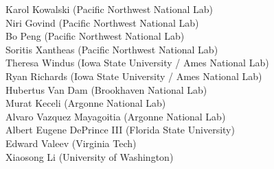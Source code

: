 \documentclass[10pt]{res} %
\begin{document}
\begin{resume}
Karol Kowalski \dotfill (Pacific Northwest National Lab)\\
Niri Govind \dotfill (Pacific Northwest National Lab)\\
Bo Peng \dotfill (Pacific Northwest National Lab)\\
Soritis Xantheas \dotfill (Pacific Northwest National Lab)\\
Theresa Windus \dotfill (Iowa State University / Ames National Lab)\\
Ryan Richards \dotfill (Iowa State University / Ames National Lab)\\
Hubertus Van Dam \dotfill (Brookhaven National Lab)\\
Murat Keceli \dotfill (Argonne National Lab)\\
Alvaro Vazquez Mayagoitia \dotfill (Argonne National Lab)\\
Albert Eugene DePrince III \dotfill (Florida State University)\\
Edward Valeev \dotfill (Virginia Tech)\\
Xiaosong Li \dotfill (University of Washington)\\



\end{resume}
\end{document}
